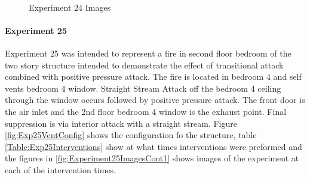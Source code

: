 \documentclass{article}
\begin{document}
\begin{figure}[H]
	\ContinuedFloat 
	\centering 
	 \ 
	\caption{Experiment 24 Images}
	\label{fig:Experiment24ImagesCont3} 
\end{figure}

\paragraph{Experiment 25}\mbox{}

Experiment 25 was intended to represent a fire in second floor bedroom of the two story structure intended to demonstrate the effect of transitional attack combined with positive pressure attack. The fire is located in bedroom 4 and self vents bedroom 4 window. Straight Stream Attack off the bedroom 4 ceiling through the window occurs followed by positive pressure attack. The front door is the air inlet and the 2nd floor bedroom 4 window is the exhaust point. Final suppression is via interior attack with a straight stream. Figure \ref{fig:Exp25VentConfig} shows the configuration fo the structure, table \ref{Table:Exp25Interventions} show at what times interventions were preformed and the figures in \ref{fig:Experiment25ImagesCont1} shows images of the experiment at each of the intervention times.
\end{document}
